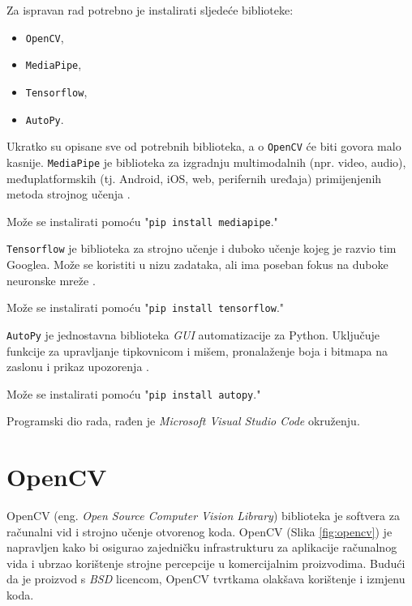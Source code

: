 \documentclass[]{foi} %
\begin{document}
\noindent
Za ispravan rad potrebno je instalirati sljedeće biblioteke:

\begin{itemize}
    \item \texttt{OpenCV},
    \item \texttt{MediaPipe},
    \item \texttt{Tensorflow},
    \item \texttt{AutoPy}.
\end{itemize}

\noindent
Ukratko su opisane sve od potrebnih biblioteka, a o \texttt{OpenCV} će biti govora malo kasnije.
\noindent
\texttt{MediaPipe} je biblioteka za izgradnju multimodalnih (npr. video, audio), međuplatformskih (tj. Android, iOS, web, perifernih uređaja) primijenjenih metoda strojnog učenja \cite{install}.

Može se instalirati pomoću "\texttt{pip install mediapipe}."

\noindent
\texttt{Tensorflow} je biblioteka za strojno učenje i duboko učenje kojeg je razvio tim Googlea. Može se koristiti u nizu zadataka, ali ima poseban fokus na duboke neuronske mreže \cite{install}.

Može se instalirati pomoću "\texttt{pip install tensorflow}."

\noindent
\texttt{AutoPy} je jednostavna biblioteka \textit{GUI} automatizacije za Python. Uključuje funkcije za upravljanje tipkovnicom i mišem, pronalaženje boja i bitmapa na zaslonu i prikaz upozorenja \cite{install}.

Može se instalirati pomoću "\texttt{pip install autopy}."

\noindent
Programski dio rada, rađen je \textit{Microsoft Visual Studio Code} okruženju.

\newpage
\section{OpenCV}

OpenCV (eng. \textit{Open Source Computer Vision Library}) \cite{opencv} biblioteka je softvera za računalni vid i strojno učenje otvorenog koda. OpenCV (Slika \ref{fig:opencv}) je napravljen kako bi osigurao zajedničku infrastrukturu za aplikacije računalnog vida i ubrzao korištenje strojne percepcije u komercijalnim proizvodima. Budući da je proizvod s \textit{BSD} licencom, OpenCV tvrtkama olakšava korištenje i izmjenu koda.
\end{document}
